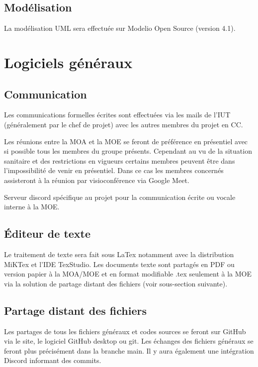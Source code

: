 \documentclass[11pt,a4paper,titlepage,openright]{report}
\begin{document}
        \subsection{Modélisation}
        La modélisation UML sera effectuée sur Modelio Open Source (version 4.1).
        
    \section{Logiciels généraux}
        \subsection{Communication}
        \par Les communications formelles écrites sont effectuées via les mails de l’IUT (généralement par le chef
        de projet) avec les autres membres du projet en CC.
        \par Les réunions entre la MOA et la MOE se feront de préférence en présentiel avec si possible tous les membres du groupe présents. Cependant au vu de la situation sanitaire et des restrictions en vigueurs certains membres peuvent être dans l'impossibilité de venir en présentiel. Dans ce cas les membres concernés assisteront à la réunion par visioconférence via Google Meet.
        \par Serveur discord spécifique au projet pour la communication écrite ou vocale interne à la MOE.
        
        
        \subsection{Éditeur de texte}
        Le traitement de texte sera fait sous LaTex notamment avec la distribution MiKTex et l'IDE TexStudio. Les documents texte sont partagés en PDF ou version papier à la MOA/MOE  et en format modifiable .tex seulement à la MOE via la solution de partage distant des fichiers (voir sous-section suivante).
        
        \subsection{Partage distant des fichiers}
        Les partages de tous les fichiers généraux et codes sources se feront sur GitHub via le site, le logiciel GitHub desktop ou git. Les échanges des fichiers généraux se feront plus précisément dans la branche main. Il y aura également une intégration Discord informant des commits.
        
\end{document}
